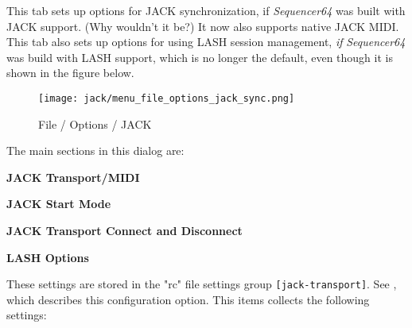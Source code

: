    This tab sets up options for JACK synchronization, if \textsl{Sequencer64}
   was built with JACK support.  (Why wouldn't it be?)
   It now also supports native JACK MIDI.
   This tab also sets up options for using LASH session management, \textsl{if}
   \textsl{Sequencer64} was build with LASH support, which is no longer the
   default, even though it is shown in the figure below.

\begin{figure}[H]
   \centering 
   \texttt{[image: jack/menu\_file\_options\_jack\_sync.png]}
   \caption{File / Options / JACK}
   \label{fig:seq64_menu_file_options_jack_sync}
\end{figure}

   The main sections in this dialog are:

   \begin{enumber}
      \item \textbf{JACK Transport/MIDI}
      \item \textbf{JACK Start Mode}
      \item \textbf{JACK Transport Connect and Disconnect}
      \item \textbf{LASH Options}
   \end{enumber}

   \setcounter{ItemCounter}{0}      %

   These settings are stored in the "rc" file settings group
   \texttt{[jack-transport]}.
   See ,
   which describes this configuration option.
   This items collects the following settings:

